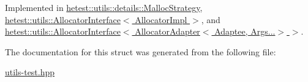 Implemented in \hyperlink{structhetest_1_1utils_1_1details_1_1MallocStrategy_a86b2b253ec7d4da560da97f6d30e7325}{hetest\-::utils\-::details\-::\-Malloc\-Strategy}, \hyperlink{structhetest_1_1utils_1_1AllocatorInterface_a2d76269d7edd0d9cb65e6bfeffc24432}{hetest\-::utils\-::\-Allocator\-Interface$<$ Allocator\-Impl $>$}, and \hyperlink{structhetest_1_1utils_1_1AllocatorInterface_a2d76269d7edd0d9cb65e6bfeffc24432}{hetest\-::utils\-::\-Allocator\-Interface$<$ Allocator\-Adapter$<$ Adaptee, Args...$>$ $>$}.



The documentation for this struct was generated from the following file\-:\begin{DoxyCompactItemize}
\item 
\hyperlink{utils-test_8hpp}{utils-\/test.\-hpp}\end{DoxyCompactItemize}
